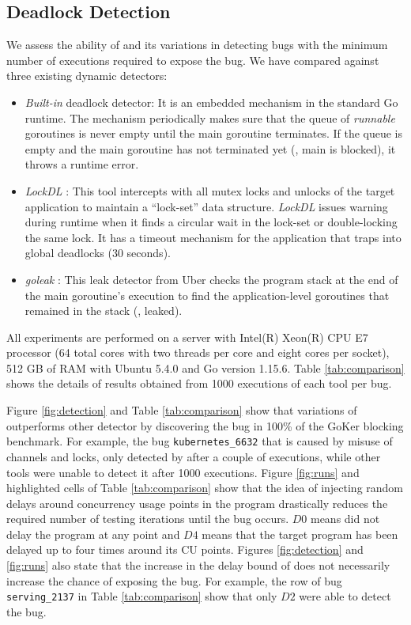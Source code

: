 

\subsection{Deadlock Detection}
\label{sec:dl_evaluation}
We assess the ability of \goat and its variations in detecting bugs with the minimum number of executions required to expose the bug.
%
We have compared \goat against three existing dynamic detectors:
\begin{itemize}
  \item \textit{Built-in} deadlock detector: It is an embedded mechanism in the standard Go runtime. The mechanism periodically makes sure that the queue of \textit{runnable} goroutines is never empty until the main goroutine terminates. If the queue is empty and the main goroutine has not terminated yet (\ie, main is blocked), it throws a runtime error.
  \item \textit{LockDL} \cite{lockdl}: This tool intercepts with all mutex locks and unlocks of the target application to maintain a ``lock-set'' data structure. \textit{LockDL} issues warning during runtime when it finds a circular wait in the lock-set or double-locking the same lock. It has a timeout mechanism for the application that traps into global deadlocks (30 seconds).
  \item \textit{goleak} \cite{goleak}: This leak detector from Uber checks the program stack at the end of the main goroutine's execution to find the application-level goroutines that remained in the stack (\ie, leaked).
\end{itemize}





All experiments are performed on a server with Intel(R) Xeon(R) CPU E7 processor (64 total cores with two threads per core and eight cores per socket), 512 GB of RAM with Ubuntu 5.4.0 and Go version 1.15.6.
%
Table \ref{tab:comparison} shows the details of results obtained from 1000 executions of each tool per bug.
%

%


%
Figure \ref{fig:detection} and Table \ref{tab:comparison} show that variations of \goat outperforms other detector by discovering the bug in 100\% of the GoKer blocking benchmark.
%
For example, the bug \texttt{kubernetes\_6632} that is caused by misuse of channels and locks, only detected by \goat after a couple of executions, while other tools were unable to detect it after 1000 executions.
%
Figure \ref{fig:runs} and highlighted cells of Table \ref{tab:comparison} show that the idea of injecting random delays around concurrency usage points in the program drastically reduces the required number of testing iterations until the bug occurs.
%
$D0$ means \goat did not delay the program at any point and $D4$ means that the target program has been delayed up to four times around its CU points.
%
Figures \ref{fig:detection} and \ref{fig:runs} also state that the increase in the delay bound of \goat does not necessarily increase the chance of exposing the bug.
%
For example, the row of bug \texttt{serving\_2137} in Table \ref{tab:comparison} show that only \goat $D2$ were able to detect the bug.




